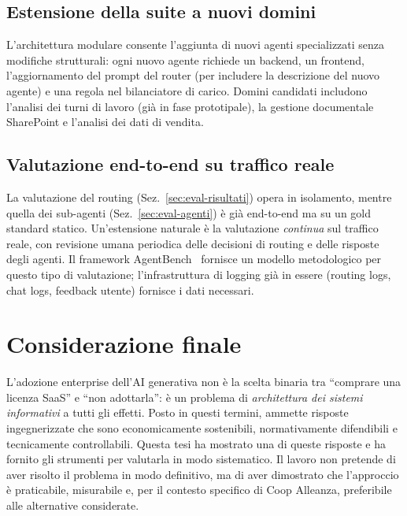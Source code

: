 \subsection{Estensione della suite a nuovi domini}
\label{subsec:concl-nuovi-domini}

L'architettura modulare consente l'aggiunta di nuovi agenti specializzati senza modifiche strutturali: ogni nuovo agente richiede un backend, un frontend, 
l'aggiornamento del prompt del router (per includere la descrizione del nuovo agente) e una regola nel bilanciatore di carico. 
Domini candidati includono l'analisi dei turni di lavoro (già in fase prototipale), la gestione documentale SharePoint e l'analisi dei dati di vendita.

\subsection{Valutazione end-to-end su traffico reale}
\label{subsec:concl-valutazione-reale}

La valutazione del routing (Sez.~\ref{sec:eval-risultati}) opera in isolamento, mentre quella dei sub-agenti (Sez.~\ref{sec:eval-agenti}) è già end-to-end ma su un gold standard statico. 
Un'estensione naturale è la valutazione \emph{continua} sul traffico reale, con revisione umana periodica delle decisioni di routing e delle risposte degli agenti. 
Il framework AgentBench~\cite{liu2023agentbench} fornisce un modello metodologico per questo tipo di valutazione; l'infrastruttura di logging già in essere (routing logs, chat logs, feedback utente) 
fornisce i dati necessari.

\section{Considerazione finale}
\label{sec:concl-finale}

L'adozione enterprise dell'AI generativa non è la scelta binaria tra ``comprare una licenza SaaS'' e ``non adottarla'': 
è un problema di \emph{architettura dei sistemi informativi} a tutti gli effetti. 
Posto in questi termini, ammette risposte ingegnerizzate che sono economicamente sostenibili, 
normativamente difendibili e tecnicamente controllabili. 
Questa tesi ha mostrato una di queste risposte e ha fornito gli strumenti per valutarla in modo sistematico. 
Il lavoro non pretende di aver risolto il problema in modo definitivo, ma di aver dimostrato che l'approccio è praticabile, misurabile e, 
per il contesto specifico di Coop Alleanza, preferibile alle alternative considerate.
